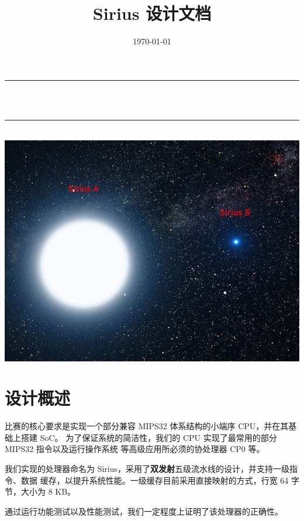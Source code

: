 \documentclass[blue,normal,cn,hide]{elegantbook}
\title{Sirius 设计文档}
\date{\today}
\author{}
\makeatletter
\let\thetitle\@title
\makeatother
\begin{document}
\begin{titlepage}
    \vspace*{\fill}
    \begin{center}
        \rule{\linewidth}{0.2 mm} \\[0.4 cm]
        { \huge \bfseries \thetitle}\\
        \rule{\linewidth}{0.2 mm} \\[1.5 cm]
        \vspace*{2cm}
        \includegraphics[scale = 0.618]{logo.jpg}\\[1.0 cm]
    \end{center}
    \vspace*{\fill}
\end{titlepage}

\tableofcontents
\mainmatter

\chapter{设计概述}

比赛的核心要求是实现一个部分兼容 MIPS32 体系结构的小端序 CPU，并在其基础上搭建 SoC。
为了保证系统的简洁性，我们的 CPU 实现了最常用的部分 MIPS32 指令以及运行操作系统
等高级应用所必须的协处理器 CP0 等。

我们实现的处理器命名为 Sirius，采用了\textbf{双发射}五级流水线的设计\cite{Patterson:2013:COD:2568134}，并支持一级指令、数据
缓存，以提升系统性能。一级缓存目前采用直接映射的方式，行宽 64 字节，大小为 8 KB。

通过运行功能测试以及性能测试，我们一定程度上证明了该处理器的正确性。
\end{document}
